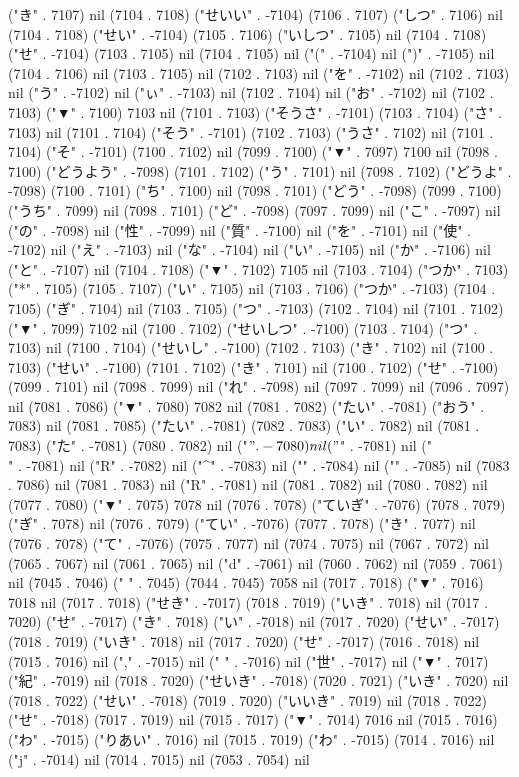 ("き" . 7107) nil (7104 . 7108) ("せいい" . -7104) (7106 . 7107) ("しつ" . 7106) nil (7104 . 7108) ("せい" . -7104) (7105 . 7106) ("いしつ" . 7105) nil (7104 . 7108) ("せ" . -7104) (7103 . 7105) nil (7104 . 7105) nil ("(" . -7104) nil (")" . -7105) nil (7104 . 7106) nil (7103 . 7105) nil (7102 . 7103) nil ("を" . -7102) nil (7102 . 7103) nil ("う" . -7102) nil ("ぃ" . -7103) nil (7102 . 7104) nil ("お" . -7102) nil (7102 . 7103) ("▼" . 7100) 7103 nil (7101 . 7103) ("そうさ" . -7101) (7103 . 7104) ("さ" . 7103) nil (7101 . 7104) ("そう" . -7101) (7102 . 7103) ("うさ" . 7102) nil (7101 . 7104) ("そ" . -7101) (7100 . 7102) nil (7099 . 7100) ("▼" . 7097) 7100 nil (7098 . 7100) ("どうよう" . -7098) (7101 . 7102) ("う" . 7101) nil (7098 . 7102) ("どうよ" . -7098) (7100 . 7101) ("ち" . 7100) nil (7098 . 7101) ("どう" . -7098) (7099 . 7100) ("うち" . 7099) nil (7098 . 7101) ("ど" . -7098) (7097 . 7099) nil ("こ" . -7097) nil ("の" . -7098) nil ("性" . -7099) nil ("質" . -7100) nil ("を" . -7101) nil ("使" . -7102) nil ("え" . -7103) nil ("な" . -7104) nil ("い" . -7105) nil ("か" . -7106) nil ("と" . -7107) nil (7104 . 7108) ("▼" . 7102) 7105 nil (7103 . 7104) ("つか" . 7103) ("*" . 7105) (7105 . 7107) ("い" . 7105) nil (7103 . 7106) ("つか" . -7103) (7104 . 7105) ("ぎ" . 7104) nil (7103 . 7105) ("つ" . -7103) (7102 . 7104) nil (7101 . 7102) ("▼" . 7099) 7102 nil (7100 . 7102) ("せいしつ" . -7100) (7103 . 7104) ("つ" . 7103) nil (7100 . 7104) ("せいし" . -7100) (7102 . 7103) ("き" . 7102) nil (7100 . 7103) ("せい" . -7100) (7101 . 7102) ("き" . 7101) nil (7100 . 7102) ("せ" . -7100) (7099 . 7101) nil (7098 . 7099) nil ("れ" . -7098) nil (7097 . 7099) nil (7096 . 7097) nil (7081 . 7086) ("▼" . 7080) 7082 nil (7081 . 7082) ("たい" . -7081) ("おう" . 7083) nil (7081 . 7085) ("たい" . -7081) (7082 . 7083) ("い" . 7082) nil (7081 . 7083) ("た" . -7081) (7080 . 7082) nil ("$" . -7080) nil ("$" . -7081) nil ("\\" . -7081) nil ("R" . -7082) nil ("^" . -7083) nil ("{" . -7084) nil ("}" . -7085) nil (7083 . 7086) nil (7081 . 7083) nil ("R" . -7081) nil (7081 . 7082) nil (7080 . 7082) nil (7077 . 7080) ("▼" . 7075) 7078 nil (7076 . 7078) ("ていぎ" . -7076) (7078 . 7079) ("ぎ" . 7078) nil (7076 . 7079) ("てい" . -7076) (7077 . 7078) ("き" . 7077) nil (7076 . 7078) ("て" . -7076) (7075 . 7077) nil (7074 . 7075) nil (7067 . 7072) nil (7065 . 7067) nil (7061 . 7065) nil ("d" . -7061) nil (7060 . 7062) nil (7059 . 7061) nil (7045 . 7046) (" " . 7045) (7044 . 7045) 7058 nil (7017 . 7018) ("▼" . 7016) 7018 nil (7017 . 7018) ("せき" . -7017) (7018 . 7019) ("いき" . 7018) nil (7017 . 7020) ("せ" . -7017) ("き" . 7018) ("い" . -7018) nil (7017 . 7020) ("せい" . -7017) (7018 . 7019) ("いき" . 7018) nil (7017 . 7020) ("せ" . -7017) (7016 . 7018) nil (7015 . 7016) nil ("," . -7015) nil (" " . -7016) nil ("世" . -7017) nil ("▼" . 7017) ("紀" . -7019) nil (7018 . 7020) ("せいき" . -7018) (7020 . 7021) ("いき" . 7020) nil (7018 . 7022) ("せい" . -7018) (7019 . 7020) ("いいき" . 7019) nil (7018 . 7022) ("せ" . -7018) (7017 . 7019) nil (7015 . 7017) ("▼" . 7014) 7016 nil (7015 . 7016) ("わ" . -7015) ("りあい" . 7016) nil (7015 . 7019) ("わ" . -7015) (7014 . 7016) nil ("j" . -7014) nil (7014 . 7015) nil (7053 . 7054) nil 